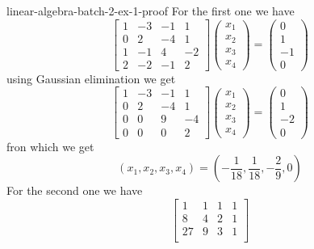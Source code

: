 \documentclass[preview]{standalone}
\begin{document}
\begin{snippetsolution}{linear-algebra-batch-2-ex-1-proof}{}
    For the first one we have
    \[
        \begin{bmatrix}
            1 & -3 & -1 & 1 \\
            0 & 2 & -4 & 1 \\
            1 & -1 & 4 & -2 \\
            2 & -2 & -1 & 2
        \end{bmatrix}
        \begin{pmatrix}
            x_1 \\
            x_2 \\
            x_3 \\
            x_4
        \end{pmatrix}
        = \begin{pmatrix}
            0 \\
            1 \\
            -1 \\
            0
        \end{pmatrix}
    \]
    using Gaussian elimination we get
    \[
        \begin{bmatrix}
            1 & -3 & -1 & 1 \\
            0 & 2 & -4 & 1 \\
            0 & 0 & 9 & -4 \\
            0 & 0 & 0 & 2
        \end{bmatrix}
        \begin{pmatrix}
            x_1 \\
            x_2 \\
            x_3 \\
            x_4
        \end{pmatrix}
        = \begin{pmatrix}
            0 \\
            1 \\
            -2 \\
            0
        \end{pmatrix}
    \]
    fron which we get
    \[
        (x_1, x_2, x_3, x_4) = \left(
            -\frac{1}{18}, \frac{1}{18}, -\frac{2}{9}, 0
        \right)
    \]
    For the second one we have
    \[
        \begin{bmatrix}
            1 & 1 & 1 & 1 \\
            8 & 4 & 2 & 1 \\
            27 & 9 & 3 & 1 \\

\end{bmatrix}\]
\end{snippetsolution}
\end{document}
